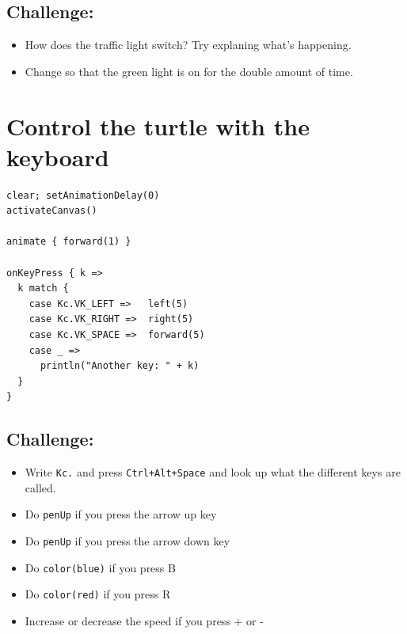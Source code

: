 \section*{\color{BrickRed}Challenge:}


\begin{itemize}

\item {How does the traffic light switch? Try explaning what's happening.}
\item {Change so that the green light is on for the double amount of time.}

\end{itemize}


\chapter{Control the turtle with the keyboard}
\begin{multicols}{2}

\begin{lstlisting}[basicstyle={\ttfamily\fontsize{18}{22}\selectfont},numbers=none]
clear; setAnimationDelay(0)
activateCanvas()

animate { forward(1) }

onKeyPress { k =>
  k match {
    case Kc.VK_LEFT =>   left(5)
    case Kc.VK_RIGHT =>  right(5)
    case Kc.VK_SPACE =>  forward(5)
    case _ => 
      println("Another key: " + k)
  }
}
\end{lstlisting}
        


\columnbreak


\section*{\color{BrickRed}Challenge:}


\begin{itemize}

\item {Write \lstinline{Kc.} and press \lstinline{Ctrl+Alt+Space} and look up what the different keys are called.}
\item {Do \lstinline{penUp} if you press the arrow up key}
\item {Do \lstinline{penUp} if you press the arrow down key}
\item {Do \lstinline{color(blue)} if you press B}
\item {Do \lstinline{color(red)} if you press R}
\item {Increase or decrease the speed if you press + or -}

\end{itemize}


\end{multicols}

